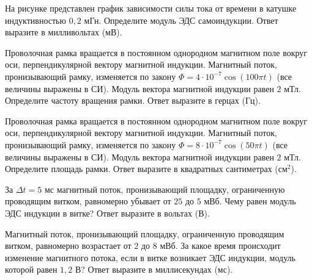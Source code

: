 \begin{taskbasic}[code={\label{task:elem_ind_v4_n12}}]
На рисунке представлен график зависимости силы тока от времени в катушке индуктивностью $0{,}2\text{ мГн}$. Определите модуль ЭДС самоиндукции. Ответ выразите в милливольтах (мВ).

\end{taskbasic}

\begin{taskbasic}[code={\label{task:elem_ind_v5_n12}}]
Проволочная рамка вращается в постоянном однородном магнитном поле вокруг оси, перпендикулярной вектору магнитной индукции. Магнитный поток, пронизывающий рамку, изменяется по закону $\Phi = 4\cdot 10^{-7}\cos(100\pi t)$ (все величины выражены в СИ). Модуль вектора магнитной индукции равен $2\text{ мТл}$. Определите частоту вращения рамки. Ответ выразите в герцах (Гц).

\end{taskbasic}

\begin{taskbasic}[code={\label{task:elem_ind_v6_n12}}]
Проволочная рамка вращается в постоянном однородном магнитном поле вокруг оси, перпендикулярной вектору магнитной индукции. Магнитный поток, пронизывающий рамку, изменяется по закону $\Phi = 8\cdot 10^{-7}\cos(50\pi t)$ (все величины выражены в СИ). Модуль вектора магнитной индукции равен $2\text{ мТл}$. Определите площадь рамки. Ответ выразите в квадратных сантиметрах ($\text{см}^2$).

\end{taskbasic}

\begin{taskbasic}[code={\label{task:elem_ind_v7_n12}}]
За $\Delta t = 5\text{ мс}$ магнитный поток, пронизывающий площадку, ограниченную проводящим витком, равномерно убывает от $25$ до $5\text{ мВб}$. Чему равен модуль ЭДС индукции в витке? Ответ выразите в вольтах (В).

\end{taskbasic}

\begin{taskbasic}[code={\label{task:elem_ind_v8_n12}}]
Магнитный поток, пронизывающий площадку, ограниченную проводящим витком, равномерно возрастает от $2$ до $8\text{ мВб}$. За какое время происходит изменение магнитного потока, если в витке возникает ЭДС индукции, модуль которой равен $1{,}2\text{ В}$? Ответ выразите в миллисекундах (мс).

\end{taskbasic}

